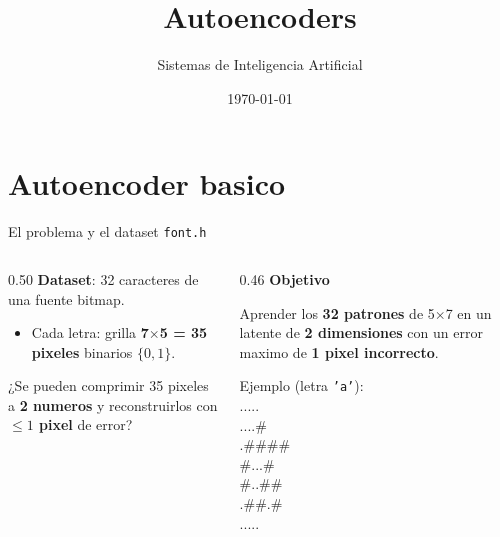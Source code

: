 \documentclass[aspectratio=169, 10pt]{beamer}
\title{Autoencoders}
\author{Sistemas de Inteligencia Artificial}
\institute{Grupo 6 --- ITBA --- 2026}
\date{\today}
\renewcommand{\maketitle}{\frame{\titlepage}}
\begin{document}
\maketitle


\section{Autoencoder basico}

\begin{frame}{El problema y el dataset \texttt{font.h}}
  \begin{columns}[T]
    \begin{column}{0.50\textwidth}
      \textbf{Dataset}: 32 caracteres de una fuente bitmap.
      \begin{itemize}
        \item Cada letra: grilla \textbf{7$\times$5 = 35 pixeles} binarios $\{0,1\}$.
      \end{itemize}
      \vspace{0.4em}
      ¿Se pueden comprimir 35 pixeles a \textbf{2 numeros} y reconstruirlos
      con \textbf{$\le 1$ pixel} de error?
    \end{column}
    \begin{column}{0.46\textwidth}
      \centering
      \textbf{Objetivo}
      \begin{block}{}
        Aprender los \textbf{32 patrones} de 5$\times$7 en un latente de
        \textbf{2 dimensiones} con un error maximo de \textbf{1 pixel incorrecto}.
      \end{block}
      \vspace{0.3em}
      {\footnotesize Ejemplo (letra \texttt{'a'}):}\\[2pt]
      {\ttfamily\footnotesize
        .....\\ ....\#\\ .\#\#\#\#\\ \#...\#\\ \#..\#\#\\ .\#\#.\#\\ .....}
    \end{column}
  \end{columns}
\end{frame}

\end{document}
